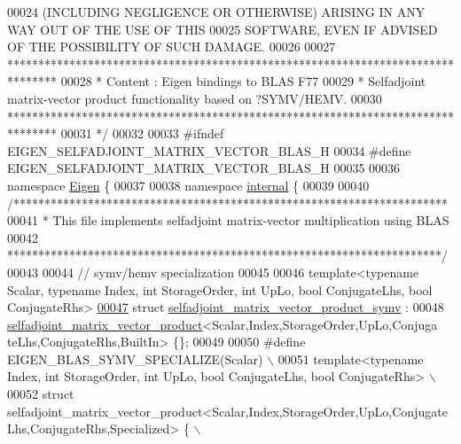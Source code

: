 \begin{DoxyCode}
00024 \textcolor{comment}{ (INCLUDING NEGLIGENCE OR OTHERWISE) ARISING IN ANY WAY OUT OF THE USE OF THIS}
00025 \textcolor{comment}{ SOFTWARE, EVEN IF ADVISED OF THE POSSIBILITY OF SUCH DAMAGE.}
00026 \textcolor{comment}{}
00027 \textcolor{comment}{ ********************************************************************************}
00028 \textcolor{comment}{ *   Content : Eigen bindings to BLAS F77}
00029 \textcolor{comment}{ *   Selfadjoint matrix-vector product functionality based on ?SYMV/HEMV.}
00030 \textcolor{comment}{ ********************************************************************************}
00031 \textcolor{comment}{*/}
00032 
00033 \textcolor{preprocessor}{#ifndef EIGEN\_SELFADJOINT\_MATRIX\_VECTOR\_BLAS\_H}
00034 \textcolor{preprocessor}{#define EIGEN\_SELFADJOINT\_MATRIX\_VECTOR\_BLAS\_H}
00035 
00036 \textcolor{keyword}{namespace }\hyperlink{namespace_eigen}{Eigen} \{ 
00037 
00038 \textcolor{keyword}{namespace }\hyperlink{namespaceinternal}{internal} \{
00039 
00040 \textcolor{comment}{/**********************************************************************}
00041 \textcolor{comment}{* This file implements selfadjoint matrix-vector multiplication using BLAS}
00042 \textcolor{comment}{**********************************************************************/}
00043 
00044 \textcolor{comment}{// symv/hemv specialization}
00045 
00046 \textcolor{keyword}{template}<\textcolor{keyword}{typename} Scalar, \textcolor{keyword}{typename} Index, \textcolor{keywordtype}{int} StorageOrder, \textcolor{keywordtype}{int} UpLo, \textcolor{keywordtype}{bool} ConjugateLhs, \textcolor{keywordtype}{bool} ConjugateRhs>
\hyperlink{struct_eigen_1_1internal_1_1selfadjoint__matrix__vector__product__symv}{00047} \textcolor{keyword}{struct }\hyperlink{struct_eigen_1_1internal_1_1selfadjoint__matrix__vector__product__symv}{selfadjoint\_matrix\_vector\_product\_symv} :
00048   \hyperlink{struct_eigen_1_1internal_1_1selfadjoint__matrix__vector__product}{selfadjoint\_matrix\_vector\_product}<Scalar,Index,StorageOrder,UpLo,Conjuga
      teLhs,ConjugateRhs,BuiltIn> \{\};
00049 
00050 \textcolor{preprocessor}{#define EIGEN\_BLAS\_SYMV\_SPECIALIZE(Scalar) \(\backslash\)}
00051 \textcolor{preprocessor}{template<typename Index, int StorageOrder, int UpLo, bool ConjugateLhs, bool ConjugateRhs> \(\backslash\)}
00052 \textcolor{preprocessor}{struct
       selfadjoint\_matrix\_vector\_product<Scalar,Index,StorageOrder,UpLo,ConjugateLhs,ConjugateRhs,Specialized> \{ \(\backslash\)}

\end{DoxyCode}
